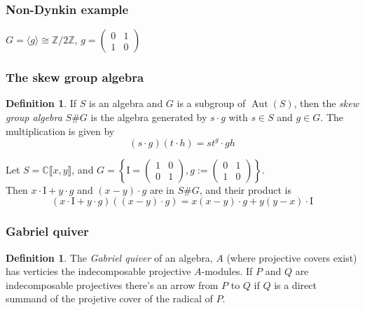 \documentclass[screen, aspectratio=43]{beamer}
\theoremstyle{definition}
\newtheorem{defin}[theorem]{Definition}
\newcommand{\C}{\mathbb{C}}
\newcommand{\Z}{\mathbb{Z}}
\DeclareMathOperator{\Aut}{Aut}
\begin{document}
\begin{frame}[fragile]
	\frametitle{Non-Dynkin example}
	\begin{example}
	\begin{center}
		$G = \langle g \rangle \cong \Z/2\Z$, $g = \begin{pmatrix}
		0 & 1\\
		1 & 0
		\end{pmatrix}$
	\end{center}
	\begin{center}
	\end{center}
	\end{example}
\end{frame}

\begin{frame}
	\frametitle{The skew group algebra}
	\begin{defin}
		If $S$ is an algebra and $G$ is a subgroup of $\Aut(S)$, then the \textit{skew group algebra} $S\#G$ is the algebra generated by $s \cdot g$ with $s \in S$ and $g \in G$. The multiplication is given by $$(s \cdot g)(t \cdot h) = s t^g \cdot gh$$
	\end{defin}
	\begin{example}
		Let $S= \C \llbracket x, y \rrbracket$, and $G = \left\{ \mathrm{I}= \begin{pmatrix}
		1 & 0\\
		0 & 1
		\end{pmatrix}, g:= \begin{pmatrix}
		0 & 1\\
		1 & 0
		\end{pmatrix} \right\}$. \\
		Then $x \cdot \mathrm{I} + y\cdot g$ and $(x-y) \cdot g$ are in $S\#G$, and their product is $$(x \cdot \mathrm{I} + y\cdot g)((x-y) \cdot g) = x(x-y) \cdot g + y(y-x) \cdot \mathrm{I}$$
	\end{example}
\end{frame}

\begin{frame}[fragile]
	\frametitle{Gabriel quiver}
	\begin{defin}
		The \textit{Gabriel quiver} of an algebra, $A$ (where projective covers exist) has verticies the indecomposable projective $A$-modules. If $P$ and $Q$ are indecomposable projectives there's an arrow from $P$ to $Q$ if $Q$ is a direct summand of the projetive cover of the radical of $P$.
		\begin{center}
		\end{center}
	\end{defin}
\end{frame}
\end{document}
